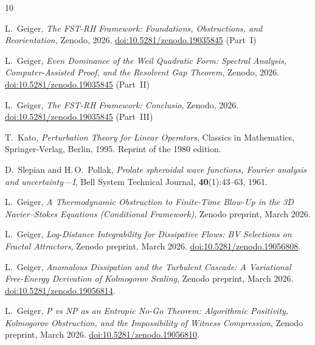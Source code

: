 \documentclass[12pt,a4paper]{article}
\theoremstyle{definition}
\theoremstyle{remark}
\begin{document}
\begin{thebibliography}{10}

L.~Geiger,
\emph{The FST-RH Framework: Foundations, Obstructions, and Reorientation},
Zenodo, 2026.
\href{https://doi.org/10.5281/zenodo.19035845}{doi:10.5281/zenodo.19035845} (Part~I)

L.~Geiger,
\emph{Even Dominance of the Weil Quadratic Form: Spectral Analysis, Computer-Assisted Proof, and the Resolvent Gap Theorem},
Zenodo, 2026.
\href{https://doi.org/10.5281/zenodo.19035845}{doi:10.5281/zenodo.19035845} (Part~II)

L.~Geiger,
\emph{The FST-RH Framework: Conclusio},
Zenodo, 2026.
\href{https://doi.org/10.5281/zenodo.19035845}{doi:10.5281/zenodo.19035845} (Part~III)


T.~Kato,
\emph{Perturbation Theory for Linear Operators},
Classics in Mathematics, Springer-Verlag, Berlin, 1995.
Reprint of the 1980 edition.

D.~Slepian and H.\,O.~Pollak,
\emph{Prolate spheroidal wave functions, Fourier analysis and uncertainty---I},
Bell System Technical Journal, \textbf{40}(1):43--63, 1961.

L.~Geiger,
\emph{A Thermodynamic Obstruction to Finite-Time Blow-Up in the 3D Navier--Stokes Equations (Conditional Framework)},
Zenodo preprint, March 2026.

L.~Geiger,
\emph{Log-Distance Integrability for Dissipative Flows: BV Selections on Fractal Attractors},
Zenodo preprint, March 2026.
\href{https://doi.org/10.5281/zenodo.19056808}{doi:10.5281/zenodo.19056808}.

L.~Geiger,
\emph{Anomalous Dissipation and the Turbulent Cascade: A Variational Free-Energy Derivation of Kolmogorov Scaling},
Zenodo preprint, March 2026.
\href{https://doi.org/10.5281/zenodo.19056814}{doi:10.5281/zenodo.19056814}.

L.~Geiger,
\emph{P vs NP as an Entropic No-Go Theorem: Algorithmic Positivity, Kolmogorov Obstruction, and the Impossibility of Witness Compression},
Zenodo preprint, March 2026.
\href{https://doi.org/10.5281/zenodo.19056810}{doi:10.5281/zenodo.19056810}.


\end{thebibliography}
\end{document}
